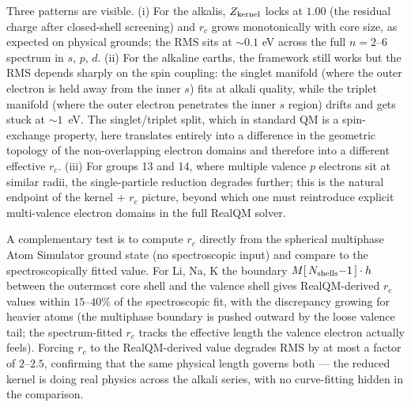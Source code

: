 \documentclass[11pt]{article}
\begin{document}
Three patterns are visible. (i) For the alkalis, $Z_{\rm kernel}$ locks at $1.00$ (the residual charge after closed-shell screening) and $r_c$ grows monotonically with core size, as expected on physical grounds; the RMS sits at $\sim 0.1$ eV across the full $n = 2$--$6$ spectrum in $s$, $p$, $d$. (ii) For the alkaline earths, the framework still works but the RMS depends sharply on the spin coupling: the singlet manifold (where the outer electron is held away from the inner $s$) fits at alkali quality, while the triplet manifold (where the outer electron penetrates the inner $s$ region) drifts and gets stuck at $\sim 1$~eV. The singlet/triplet split, which in standard QM is a spin-exchange property, here translates entirely into a difference in the geometric topology of the non-overlapping electron domains and therefore into a different effective $r_c$. (iii) For groups 13 and 14, where multiple valence $p$ electrons sit at similar radii, the single-particle reduction degrades further; this is the natural endpoint of the kernel + $r_c$ picture, beyond which one must reintroduce explicit multi-valence electron domains in the full RealQM solver.

A complementary test is to compute $r_c$ directly from the spherical multiphase Atom Simulator ground state (no spectroscopic input) and compare to the spectroscopically fitted value. For Li, Na, K the boundary $M[\,N_{\rm shells}{-}1\,] \cdot h$ between the outermost core shell and the valence shell gives RealQM-derived $r_c$ values within $15$--$40\%$ of the spectroscopic fit, with the discrepancy growing for heavier atoms (the multiphase boundary is pushed outward by the loose valence tail; the spectrum-fitted $r_c$ tracks the effective length the valence electron actually feels). Forcing $r_c$ to the RealQM-derived value degrades RMS by at most a factor of $2$--$2.5$, confirming that the same physical length governs both --- the reduced kernel is doing real physics across the alkali series, with no curve-fitting hidden in the comparison.
\end{document}
